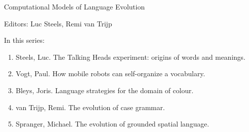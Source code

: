 {\large Computational Models of Language Evolution}

\bigskip

Editors: Luc Steels, Remi van Trijp

\bigskip

In this series:

\begin{enumerate}
\item Steels, Luc. The Talking Heads experiment: origins of words and meanings.
\item Vogt, Paul. How mobile robots can self-organize a vocabulary.
\item Bleys, Joris. Language strategies for the domain of colour.
\item van Trijp, Remi. The evolution of case grammar.
\item Spranger, Michael. The evolution of grounded spatial language.
\end{enumerate}


